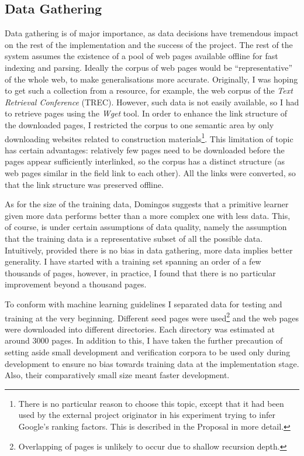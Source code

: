 \documentclass[12pt,a4paper,notitlepage,twoside]{scrbook}
\begin{document}
\subsection{Data Gathering}
\label{prep:data}
Data gathering is of major importance, as data decisions have tremendous impact on the
rest of the implementation and the success of the project. The rest of the system assumes
the existence of a pool of web pages available offline for fast indexing and parsing.
Ideally the corpus of web pages would be ``representative'' of the whole web, to make
generalisations more accurate.  Originally, I was hoping to get such a collection from a
resource, for example, the web corpus of the \textit{Text Retrieval Conference} (TREC).
However, such data is not easily available, so I had to retrieve pages using the
\textit{Wget} tool. In order to enhance the link structure of the downloaded pages, I restricted the corpus to one
semantic area by only downloading websites related to construction
materials\footnote{There is no particular reason to choose this topic, except that it had
been used by the external project originator in his experiment trying to infer Google's
ranking factors. This is described in the Proposal in more detail.}. This limitation of
topic has certain advantages: relatively few pages need to be  downloaded before the pages
appear sufficiently interlinked, so the corpus has a distinct structure (as web pages
similar in the field link to each other). All the links were converted, so that the link
structure was preserved offline.

As for the size of the training data, Domingos\cite{domingos} suggests that a primitive
learner given more data performs better than a more complex one with less data.  This, of
course, is under certain assumptions of data quality, namely the assumption that the
training data is a representative subset of all the possible data. Intuitively, provided
there is no bias in data gathering, more data implies better generality. I have started
with a training set spanning an order of a few thousands of pages, however, in practice, I
found that there is no particular improvement beyond a thousand pages.

To conform with machine learning guidelines I separated data for testing and training at the
very beginning. Different seed pages were used\footnote{Overlapping of pages is unlikely
to occur due to shallow recursion depth.} and the web pages were downloaded into
different directories.  Each directory was estimated at around 3000 pages. In addition to
this, I have taken the further precaution of setting aside small development and
verification corpora to be used only during development to ensure no bias towards training
data at the implementation stage. Also, their comparatively small size meant faster
development.
\end{document}
